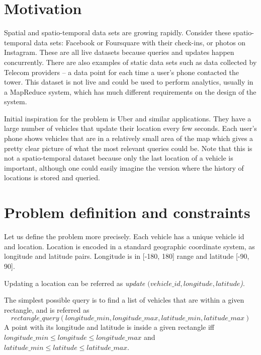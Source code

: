 \documentclass[times, utf8, diplomski]{fer}
\begin{document}

\section{Motivation}
Spatial and spatio-temporal data sets are growing rapidly. Consider these spatio-temporal data sets: Facebook or Foursquare with their check-ins, or photos on Instagram. These are all live datasets because queries and updates happen concurrently. There are also examples of static data sets such as data collected by Telecom providers -- a data point for each time a user's phone contacted the tower. This dataset is not live and could be used to perform analytics, usually in a MapReduce system, which has much different requirements on the design of the system.

Initial inspiration for the problem is Uber and similar applications. They have a large number of vehicles that update their location every few seconds. Each user's phone shows vehicles that are in a relatively small area of the map which gives a pretty clear picture of what the most relevant queries could be. Note that this is not a spatio-temporal dataset because only the last location of a vehicle is important, although one could easily imagine the version where the history of locations is stored and queried.

\section{Problem definition and constraints}
Let us define the problem more precisely. Each vehicle has a unique vehicle id and location. Location is encoded in a standard geographic coordinate system, as longitude and latitude pairs. Longitude is in [-180, 180] range and latitude [-90, 90].

Updating a location can be referred as \emph{update $(vehicle\_id, longitude, latitude$)}.

The simplest possible query is to find a list of vehicles that are within a given rectangle, and is referred as
$$rectangle\_query (longitude\_min, longitude\_max, latitude\_min, latitude\_max)$$
A point with its longitude and latitude is inside a given rectangle iff $longitude\_min \le longitude \le longitude\_max$ and $latitude\_min \le latitude \le latitude\_max$.
\end{document}
